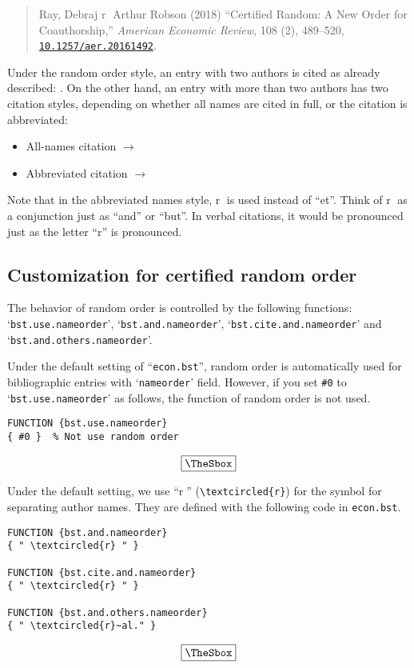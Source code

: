 \documentclass[10pt]{article}
\newenvironment{Frame}%
{\setlength{\fboxsep}{15pt}
\setlength{\mylength}{\linewidth}%
\addtolength{\mylength}{-2\fboxsep}%
\addtolength{\mylength}{-2\fboxrule}%
\Sbox
\minipage{\mylength}%
\setlength{\abovedisplayskip}{0pt}%
\setlength{\belowdisplayskip}{0pt}%
}%
{\endminipage\endSbox
\[\fbox{\TheSbox}\]}
\begin{document}
\begin{quote}
Ray, Debraj \textcircled{r} Arthur Robson (2018) ``Certified Random: A New
Order for Coauthorship,'' \textit{American Economic Review}, 108 (2),
489--520, \href{http://dx.doi.org/10.1257/aer.20161492}{
\nolinkurl{10.1257/aer.20161492}}.
\end{quote}

Under the random order style, an entry with two authors is cited as already
described: \citet{10.1257/aer.20161492}. On the other hand, an entry with more
than two authors has two citation styles, depending on whether all names are
cited in full, or the citation is abbreviated:
\begin{itemize}
 \item All-names citation $\longrightarrow$ \citet*{NBERw25205}
 \item Abbreviated citation $\longrightarrow$ \citet{NBERw25205}
\end{itemize}

Note that in the abbreviated names style, \textcircled{r} is used instead of
``et''. Think of \textcircled{r} as a conjunction just as ``and'' or ``but''. In
verbal citations, it would be pronounced just as the letter ``r'' is pronounced.

\subsection{Customization for certified random order}

The behavior of random order is controlled by the following functions:
`\texttt{bst.use.nameorder}', `\texttt{bst.and.nameorder}',
`\texttt{bst.cite.and.nameorder}' and `\texttt{bst.and.others.nameorder}'.
\vspace*{1em}

Under the default setting of ``\texttt{econ.bst}'', random order is
automatically used for bibliographic entries with `\texttt{nameorder}' field.
However, if you set \verb|#0| to `\texttt{bst.use.nameorder}' as follows, the
function of random order is not used.
\begin{Frame}
\begin{verbatim}
FUNCTION {bst.use.nameorder}
{ #0 }  % Not use random order
\end{verbatim}
\end{Frame}

Under the default setting, we use ``\textcircled{r}'' (\verb|\textcircled{r}|)
for the symbol for separating author names.
They are defined with the following code in \texttt{econ.bst}.
\begin{Frame}
\begin{verbatim}
FUNCTION {bst.and.nameorder}
{ " \textcircled{r} " }

FUNCTION {bst.cite.and.nameorder}
{ " \textcircled{r} " }

FUNCTION {bst.and.others.nameorder}
{ " \textcircled{r}~al." }
\end{verbatim}
\end{Frame}
\end{document}

